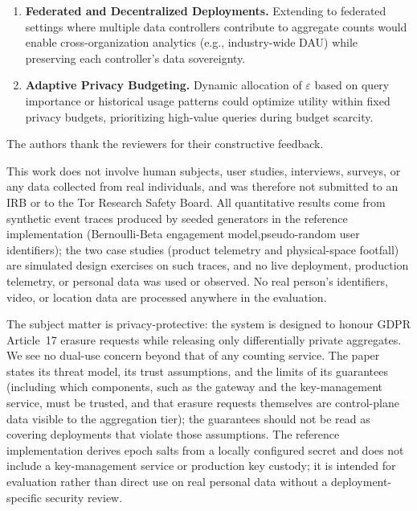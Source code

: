 \documentclass[sigconf,anonymous,review]{acmart}
\begin{document}
\begin{enumerate}
    \item \textbf{Federated and Decentralized Deployments.} Extending to federated settings where multiple data controllers contribute to aggregate counts would enable cross-organization analytics (e.g., industry-wide DAU) while preserving each controller's data sovereignty.

    \item \textbf{Adaptive Privacy Budgeting.} Dynamic allocation of $\varepsilon$ based on query importance or historical usage patterns could optimize utility within fixed privacy budgets, prioritizing high-value queries during budget scarcity.
\end{enumerate}

\appendix

\begin{acks}
    The authors thank the reviewers for their constructive feedback.
\end{acks}

\begin{ethics}
This work does not involve human subjects, user studies, interviews, surveys, or any data collected from real individuals, and was therefore not submitted to an IRB or to the Tor Research Safety Board. All quantitative results come from synthetic event traces produced by seeded generators in the reference implementation (Bernoulli-Beta engagement model,pseudo-random user identifiers); the two case studies (product telemetry and physical-space footfall) are simulated design exercises on such traces, and no live deployment, production telemetry, or personal data was used or observed. No real person's identifiers, video, or location data are processed anywhere in the evaluation.

The subject matter is privacy-protective: the system is designed to honour GDPR Article~17 erasure requests while releasing only differentially private aggregates. We see no dual-use concern beyond that of any counting service. The paper states its threat model, its trust assumptions, and the limits of its guarantees (including which components, such as the gateway and the key-management service, must be trusted, and that erasure requests themselves are control-plane data visible to the aggregation tier); the guarantees should not be read as covering deployments that violate those assumptions. The reference implementation derives epoch salts from a locally configured secret and does not include a key-management service or production key custody; it is intended for evaluation rather than direct use on real personal data without a deployment-specific security review.
\end{ethics}
\end{document}
